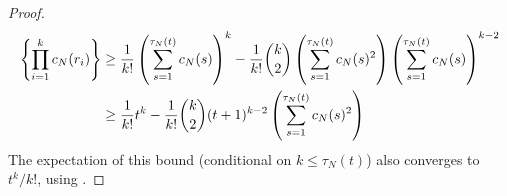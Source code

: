 \documentclass{article}
\newcommand{\E}{\mathbb{E}}
\newcommand{\1}[1]{\mathbbm{1}_{#1}}
\begin{document}
\begin{proof}
\begin{align}
\left\{ \prod_{i=1}^k c_N(r_i) \right\} 
&\geq \frac{1}{k!} \left( \sum_{s=1}^{\tau_N(t)} c_N(s) \right)^k
- \frac{1}{k!} \binom{k}{2}  \left( \sum_{s=1}^{\tau_N(t)} c_N(s)^2 \right)  \left( \sum_{s=1}^{\tau_N(t)} c_N(s) \right)^{k-2} \notag\\
&\geq \frac{1}{k!} t^k - \frac{1}{k!} \binom{k}{2} (t+1)^{k-2}  \left( \sum_{s=1}^{\tau_N(t)} c_N(s)^2 \right)
\end{align}
The expectation of this bound (conditional on $k\leq\tau_N(t)$) also converges to $t^k/k!$, using \citet[Equation (3.5)]{brown2021}.

\end{proof}
\end{document}
